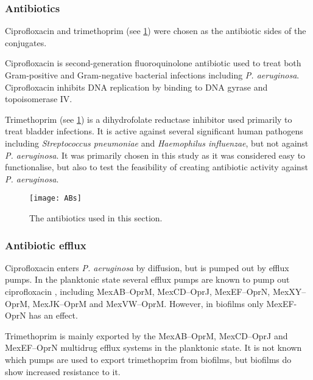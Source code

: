 \subsubsection{Antibiotics}

Ciprofloxacin  and trimethoprim  (see \ref{fgr:ABs}) were chosen as the antibiotic sides of the conjugates.
 
Ciprofloxacin  is second-generation fluoroquinolone antibiotic used to treat both Gram-positive and Gram-negative bacterial infections including \textit{P. aeruginosa}\cite{Oliphant2002,Macgowan1999}. Ciprofloxacin  inhibits DNA replication by binding to DNA gyrase and topoisomerase IV\cite{Drlica1997}.


Trimethoprim (see \ref{fgr:ABs}) is a dihydrofolate reductase inhibitor used primarily to treat bladder infections\cite{Brogden1982}. It is active against several significant human pathogens including \textit{Streptococcus pneumoniae} and \textit{Haemophilus influenzae}, but not against \textit{P. aeruginosa}. It was primarily chosen in this study as it was considered easy to functionalise, but also to test the feasibility of creating antibiotic activity against \textit{P. aeruginosa}.

\begin{figure}[H]
	\begin{center}
		\texttt{[image: ABs]}
		\caption{The antibiotics used in this section. \label{fgr:ABs}}
	\end{center}
\end{figure}



\subsubsection{Antibiotic efflux}

Ciprofloxacin  enters \textit{P. aeruginosa} by diffusion\cite{Celesk1989}, but is pumped out by efflux pumps\cite{Poole2000}. In the planktonic state several efflux pumps are known to pump out ciprofloxacin , including MexAB–OprM, MexCD–OprJ, MexEF–OprN, MexXY–OprM, MexJK–OprM and MexVW–OprM\cite{Poole2004}. 
However, in biofilms only MexEF-OprN has an effect\cite{DeKievit2001}.

Trimethoprim  is mainly exported by the MexAB–OprM\cite{Kohler1996}, MexCD–OprJ\cite{Poole1996} and MexEF–OprN\cite{Kohler1997} multidrug efflux systems\cite{Poole2001,Poole2004} in the planktonic state. It is not known which pumps are used to export trimethoprim  from biofilms, but biofilms do show increased resistance to it\cite{Olson2002}.

